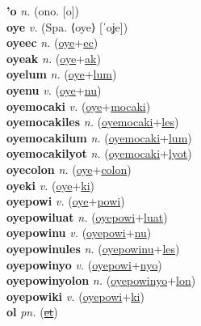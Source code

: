 \textbf{'o} \textit{n.} (ono. [o])
 \label{'o} \\
\textbf{oye} \textit{v.} (Spa. ⟨oye⟩ [ˈoʝe])
 \label{oye} \\
\textbf{oyeec} \textit{n.} (\hyperref[oye]{oye}+\hyperref[ec]{ec})
 \label{oyeec} \\
\textbf{oyeak} \textit{n.} (\hyperref[oye]{oye}+\hyperref[ak]{ak})
 \label{oyeak} \\
\textbf{oyelum} \textit{n.} (\hyperref[oye]{oye}+\hyperref[lum]{lum})
 \label{oyelum} \\
\textbf{oyenu} \textit{v.} (\hyperref[oye]{oye}+\hyperref[nu]{nu})
 \label{oyenu} \\
\textbf{oyemocaki} \textit{v.} (\hyperref[oye]{oye}+\hyperref[mocaki]{mocaki})
 \label{oyemocaki} \\
\textbf{oyemocakiles} \textit{n.} (\hyperref[oyemocaki]{oyemocaki}+\hyperref[les]{les})
 \label{oyemocakiles} \\
\textbf{oyemocakilum} \textit{n.} (\hyperref[oyemocaki]{oyemocaki}+\hyperref[lum]{lum})
 \label{oyemocakilum} \\
\textbf{oyemocakilyot} \textit{n.} (\hyperref[oyemocaki]{oyemocaki}+\hyperref[lyot]{lyot})
 \label{oyemocakilyot} \\
\textbf{oyecolon} \textit{n.} (\hyperref[oye]{oye}+\hyperref[colon]{colon})
 \label{oyecolon} \\
\textbf{oyeki} \textit{v.} (\hyperref[oye]{oye}+\hyperref[ki]{ki})
 \label{oyeki} \\
\textbf{oyepowi} \textit{v.} (\hyperref[oye]{oye}+\hyperref[powi]{powi})
 \label{oyepowi} \\
\textbf{oyepowiluat} \textit{n.} (\hyperref[oyepowi]{oyepowi}+\hyperref[luat]{luat})
 \label{oyepowiluat} \\
\textbf{oyepowinu} \textit{v.} (\hyperref[oyepowi]{oyepowi}+\hyperref[nu]{nu})
 \label{oyepowinu} \\
\textbf{oyepowinules} \textit{n.} (\hyperref[oyepowinu]{oyepowinu}+\hyperref[les]{les})
 \label{oyepowinules} \\
\textbf{oyepowinyo} \textit{v.} (\hyperref[oyepowi]{oyepowi}+\hyperref[nyo]{nyo})
 \label{oyepowinyo} \\
\textbf{oyepowinyolon} \textit{n.} (\hyperref[oyepowinyo]{oyepowinyo}+\hyperref[lon]{lon})
 \label{oyepowinyolon} \\
\textbf{oyepowiki} \textit{v.} (\hyperref[oyepowi]{oyepowi}+\hyperref[ki]{ki})
 \label{oyepowiki} \\
\textbf{ol} \textit{pn.} (\hyperref[et]{\sout{et}})
